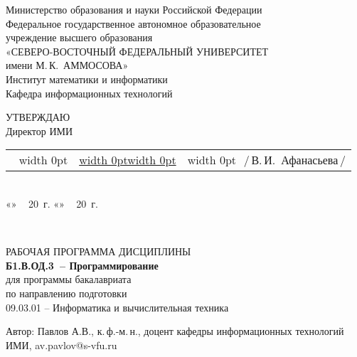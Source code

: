 \documentclass[a4paper,12pt]{article}
\makeatletter
\newcommand{\ulfield}[3]{
  \noindent
  \begin{tabularx}{\linewidth}{@{}l@{}X@{}l@{}}
  #1\if\relax\detokenize{#1}\relax\else\,~\vrule width 0pt\fi 
  & \uline{\vrule width 0pt\hfill#2\hfill\vrule width 0pt} & 
  \if\relax\detokenize{#3}\relax\else\vrule width 0pt~\,\fi #3
  \end{tabularx}
  }
\newcommand{\datefield}[1][]{\if
  \relax\detokenize{#1}\relax
  «\uline{\hspace{22pt}}»~\uline{\hspace{90pt}}\,~20\uline{\hspace{20pt}}~г.\else 
  «\uline{\hspace{18pt}}»~\uline{\hspace{60pt}}\,~20\uline{\hspace{18pt}}~г.\fi
  }
\makeatother
\begin{document}
\sloppy
\thispagestyle{empty}

\noindent
\begin{center}
Министерство образования и науки Российской Федерации \\
Федеральное государственное автономное образовательное \\
учреждение высшего образования\\
«СЕВЕРО-ВОСТОЧНЫЙ ФЕДЕРАЛЬНЫЙ УНИВЕРСИТЕТ \\
имени М.\,К.~АММОСОВА» \\
Институт математики и информатики \\
Кафедра информационных технологий

\vspace{12mm}
\begin{flushright}
\parbox{80mm}{
УТВЕРЖДАЮ\\
Директор ИМИ\\[2mm]
\ulfield{}{}{/\,В.\,И.~Афанасьева\,/}{}\\[1mm]
\datefield
\\[20mm]
}
\end{flushright}


РАБОЧАЯ ПРОГРАММА ДИСЦИПЛИНЫ
\\[2mm]
\textbf{Б1.В.ОД.3\ -- Программирование} 
\\[5mm]

для программы бакалавриата\\
по направлению подготовки \\
09.03.01 -- Информатика и вычислительная техника
\\[15mm]


\parbox{\textwidth}{
 Автор: Павлов А.В., к.\,ф.-м.\,н., доцент кафедры информационных технологий ИМИ, av.pavlov@s-vfu.ru

}
\bigskip



\end{center}
\end{document}
